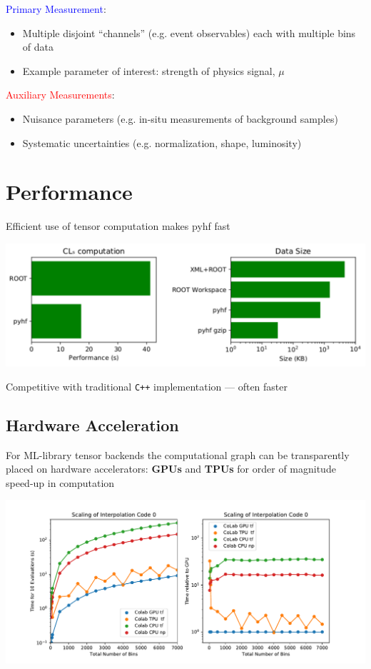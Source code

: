 \documentclass[a0paper,fleqn]{betterposter}
\begin{document}
{ \textcolor{blue}{Primary Measurement}:
 \begin{itemize}
  \item Multiple disjoint ``channels'' (e.g. event observables) each with multiple bins of data
  \item Example parameter of interest: strength of physics signal, $\mu$
 \end{itemize}
 \textcolor{red}{Auxiliary Measurements}:
 \begin{itemize}
  \item Nuisance parameters (e.g. in-situ measurements of background samples)
  \item Systematic uncertainties (e.g. normalization, shape, luminosity)
 \end{itemize}

 \vfill
 \section{Performance}
 Efficient use of tensor computation makes pyhf fast
 \begin{center}
  \includegraphics[width=\textwidth]{performance_only.pdf}
 \end{center}
 Competitive with traditional \texttt{C++} implementation --- often faster
 \vfill
 \subsection{Hardware Acceleration}
 For ML-library tensor backends the computational graph can be transparently placed on hardware accelerators: \textbf{GPUs} and \textbf{TPUs} for order of magnitude speed-up in computation
 \begin{center}
  \includegraphics[width=\textwidth]{scaling_hardware.pdf}
 \end{center}
}{

}
\end{document}
